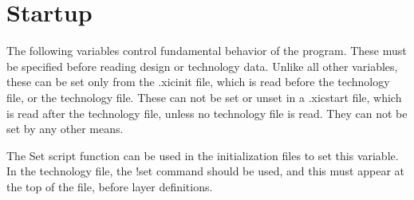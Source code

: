 \section{Startup}

The following variables control fundamental behavior of the {\Xic}
program.  These must be specified before reading design or technology
data.  Unlike all other variables, these can be set only from the {\vt
.xicinit} file, which is read before the technology file, or the
technology file.  These can not be set or unset in a {\vt .xicstart}
file, which is read after the technology file, unless no technology
file is read.  They can not be set by any other means.

The {\vt Set} script function can be used in the initialization files
to set this variable.  In the technology file, the {\vt !set} command
should be used, and this must appear at the top of the file, before
layer definitions.

